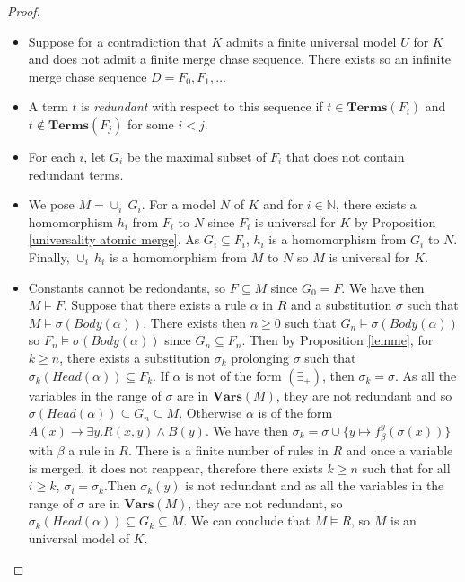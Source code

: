 \documentclass{article}
\theoremstyle{definition}
\theoremstyle{remark}
\def \N {\mathbb N}
\newcommand{\Vars}{\textbf{Vars}}
\newcommand{\Terms}{\textbf{Terms}}
\begin{document}
\begin{proof}
\begin{itemize}
\item Suppose for a contradiction that $K$ admits a finite universal model $U$ for $K$ and does not admit a finite merge chase sequence. There exists so an infinite merge chase sequence $D= F_0, F_1, \ldots$
\item A term $t$ is \emph{redundant} with respect to this sequence if $t \in \Terms(F_i)$ and $t \notin \Terms(F_j)$ for some $i < j$.
\item For each $i$, let $G_i$ be the maximal subset of $F_i$ that does not contain redundant terms.

\item We pose $M = \cup_i~G_i$. For a model $N$ of $K$ and for $i \in \N$, there exists a homomorphism $h_i$ from $F_i$ to $N$ since $F_i$ is universal for $K$ by Proposition \ref{universality atomic merge}. As $G_i \subseteq F_i$, $h_i$ is a homomorphism from $G_i$ to $N$. Finally, $\cup_i~h_i$ is a homomorphism from $M$ to $N$ so $M$ is universal for $K$.

\item Constants cannot be redondants, so $F \subseteq M$ since $G_0 =F$. We have then $M \vDash F$. Suppose that there exists a rule $\alpha$ in $R$ and a substitution $\sigma$ such that $M \vDash \sigma(\textit{Body}(\alpha))$. There exists then $n \geq 0$ such that $G_n \vDash \sigma(\textit{Body}(\alpha))$ so $F_n \vDash \sigma(\textit{Body}(\alpha))$ since $G_n \subseteq F_n$. Then by Proposition \ref{lemme}, for $k \geq n$, there exists a substitution $\sigma_k$ prolonging $\sigma$ such that $\sigma_k(\textit{Head}(\alpha)) \subseteq F_k$. If $\alpha$ is not of the form $(\exists_+)$, then $\sigma_k = \sigma$. As all the variables in the range of $\sigma$ are in $\Vars(M)$, they are not redundant and so $\sigma(\textit{Head}(\alpha)) \subseteq G_n \subseteq M$. Otherwise $\alpha$ is of the form $A(x) \rightarrow \exists y.R(x,y) \wedge B(y)$. We have then $\sigma_k = \sigma \cup \{y \mapsto f_\beta^y(\sigma(x))\}$ with $\beta$ a rule in $R$. There is a finite number of rules in $R$ and once a variable is merged, it does not reappear, therefore there exists $k \geq n$ such that for all $i \geq k$, $\sigma_i = \sigma_k$.Then $\sigma_k(y)$ is not redundant and as all the variables in the range of $\sigma$ are in $\Vars(M)$, they are not redundant, so $\sigma_k(\textit{Head}(\alpha)) \subseteq G_k \subseteq M$. We can conclude that $M \vDash R$, so $M$ is an universal model of $K$.



\end{itemize}
\end{proof}
\end{document}
